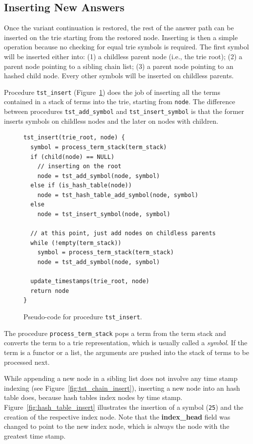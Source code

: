 \subsection{Inserting New Answers}

Once the variant continuation is restored, the rest of the answer path can be inserted on the trie starting
from the restored node. Inserting is then a simple operation because no checking for equal trie symbols is required.
The first symbol will be inserted either into: (1) a childless parent node (i.e., the trie root);
(2) a parent node pointing to a sibling chain list; (3) a parent node pointing to an hashed child node.
Every other symbols will be inserted on childless parents.

Procedure \texttt{tst\_insert} (Figure~\ref{fig:tst_insert}) does the job of inserting
all the terms contained in a stack of terms into the trie, starting from \texttt{node}.
The difference between procedures \texttt{tst\_add\_symbol} and \texttt{tst\_insert\_symbol}
is that the former inserts symbols on childless nodes and the later on nodes with children.

\begin{figure}[ht]
\begin{Verbatim}
tst_insert(trie_root, node) {
  symbol = process_term_stack(term_stack)
  if (child(node) == NULL)
    // inserting on the root
    node = tst_add_symbol(node, symbol)
  else if (is_hash_table(node))
    node = tst_hash_table_add_symbol(node, symbol)
  else
    node = tst_insert_symbol(node, symbol)
  
  // at this point, just add nodes on childless parents
  while (!empty(term_stack))
    symbol = process_term_stack(term_stack)
    node = tst_add_symbol(node, symbol)
  
  update_timestamps(trie_root, node)
  return node
}
\end{Verbatim}
\caption{Pseudo-code for procedure \texttt{tst\_insert}.}
\label{fig:tst_insert}
\end{figure}

The procedure \texttt{process\_term\_stack} pops a term from the term stack and converts the term
to a trie representation, which is usually called a \textit{symbol}. If the term is a functor or a list,
the arguments are pushed into the stack of terms to be processed next.

While appending a new node in a sibling list does not involve any
time stamp indexing (see Figure~\ref{fig:tst_chain_insert}), inserting a new node into an hash table does,
because hash tables index nodes by time stamp.
Figure~\ref{fig:hash_table_insert}
illustrates the insertion of a symbol (\texttt{25}) and the creation of the respective
index node. Note that the \textbf{index\_head} field was changed to point to the new index node,
which is always the node with the greatest time stamp.


